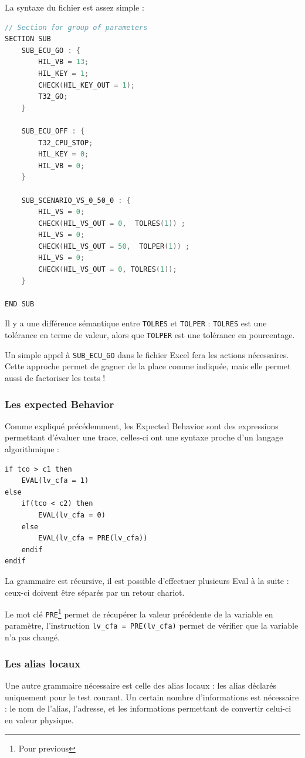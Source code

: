 	La syntaxe du fichier est assez simple :
\begin{lstlisting}[caption=Exemple de fichier cnf, language=C]
// Section for group of parameters
SECTION SUB
	SUB_ECU_GO : {
		HIL_VB = 13;
 		HIL_KEY = 1;
		CHECK(HIL_KEY_OUT = 1);
		T32_GO;
	}

	SUB_ECU_OFF : {
		T32_CPU_STOP;
 		HIL_KEY = 0;
		HIL_VB = 0;
	}

	SUB_SCENARIO_VS_0_50_0 : {
		HIL_VS = 0;
		CHECK(HIL_VS_OUT = 0,  TOLRES(1)) ;
		HIL_VS = 0;
		CHECK(HIL_VS_OUT = 50,  TOLPER(1)) ;
		HIL_VS = 0;
		CHECK(HIL_VS_OUT = 0, TOLRES(1));
	}

END SUB
\end{lstlisting}
\begin{remarque}
Il y a une différence sémantique entre \texttt{TOLRES} et \texttt{TOLPER} : \texttt{TOLRES} est une tolérance en terme de valeur, alors que \texttt{TOLPER} est une tolérance en pourcentage. 
\end{remarque}
Un simple appel à \texttt{SUB\_ECU\_GO} dans le fichier Excel fera les actions nécessaires. Cette approche permet de gagner de la place comme indiquée, mais elle permet aussi de factoriser les tests !

	\subsubsection{Les expected Behavior}
Comme expliqué précédemment, les Expected Behavior sont des expressions permettant d'évaluer une trace, celles-ci ont une syntaxe proche d'un langage algorithmique : 
\begin{lstlisting}[caption=Exemple d'expected Behavior, language=Algo]
if tco > c1 then 
	EVAL(lv_cfa = 1)
else
	if(tco < c2) then 
		EVAL(lv_cfa = 0)
	else           
		EVAL(lv_cfa = PRE(lv_cfa))
	endif
endif
\end{lstlisting}
La grammaire est récursive, il est possible d'effectuer plusieurs Eval à la suite : ceux-ci doivent être séparés par un retour chariot.

Le mot clé \texttt{PRE}\footnote{Pour previous} permet de récupérer la valeur précédente de la variable en paramètre, l'instruction \texttt{lv\_cfa = PRE(lv\_cfa)} permet de vérifier que la variable n'a pas changé.

\subsubsection{Les alias locaux}
Une autre grammaire nécessaire est celle des alias locaux : les alias déclarés uniquement pour le test courant. Un certain nombre d'informations est nécessaire : le nom de l'alias, l'adresse, et les informations permettant de convertir celui-ci en valeur physique.

